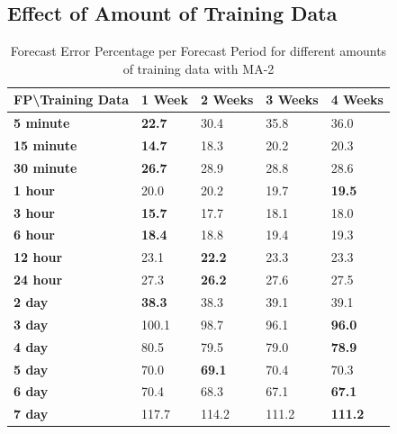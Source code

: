 \documentclass[journal]{IEEEtran}
\begin{document}
\subsection{Effect of Amount of Training Data}

\begin{table}[htpb]
  \centering
  \caption{Forecast Error Percentage per Forecast Period for different amounts of training data with MA-2}
\begin{tabular}{|l|l|l|l|l|}
\hline
\textbf{FP\textbackslash{}Training Data} & \textbf{1 Week} & \textbf{2 Weeks} & \textbf{3 Weeks} & \textbf{4 Weeks} \\ \hline
\textbf{5 minute}                        & \textbf{22.7}   & 30.4             & 35.8             & 36.0             \\ \hline
\textbf{15 minute}                       & \textbf{14.7}   & 18.3             & 20.2             & 20.3             \\ \hline
\textbf{30 minute}                       & \textbf{26.7}   & 28.9             & 28.8             & 28.6             \\ \hline
\textbf{1 hour}                          & 20.0            & 20.2             & 19.7             & \textbf{19.5}    \\ \hline
\textbf{3 hour}                          & \textbf{15.7}   & 17.7             & 18.1             & 18.0             \\ \hline
\textbf{6 hour}                          & \textbf{18.4}   & 18.8             & 19.4             & 19.3             \\ \hline
\textbf{12 hour}                         & 23.1            & \textbf{22.2}    & 23.3             & 23.3             \\ \hline
\textbf{24 hour}                         & 27.3            & \textbf{26.2}    & 27.6             & 27.5             \\ \hline
\textbf{2 day}                           & \textbf{38.3}   & 38.3             & 39.1             & 39.1             \\ \hline
\textbf{3 day}                           & 100.1           & 98.7             & 96.1             & \textbf{96.0}    \\ \hline
\textbf{4 day}                           & 80.5            & 79.5             & 79.0             & \textbf{78.9}    \\ \hline
\textbf{5 day}                           & 70.0            & \textbf{69.1}    & 70.4             & 70.3             \\ \hline
\textbf{6 day}                           & 70.4            & 68.3             & 67.1             & \textbf{67.1}    \\ \hline
\textbf{7 day}                           & 117.7           & 114.2            & 111.2            & \textbf{111.2}   \\ \hline
\end{tabular}
\label{tab5}
\end{table}
\end{document}
